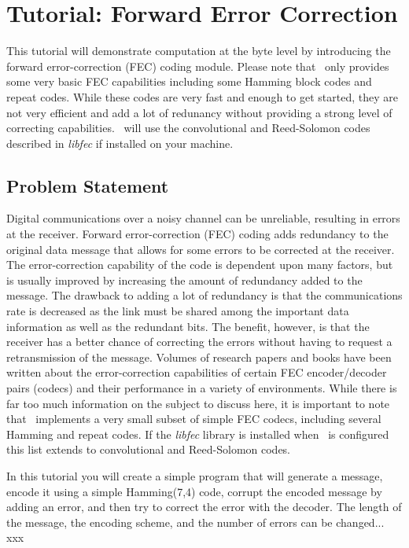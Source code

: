 % 
%

\newpage
\section{Tutorial: Forward Error Correction}
\label{tutorial:fec}

This tutorial will demonstrate computation at the byte level by
introducing the forward error-correction (FEC) coding module.
Please note that \liquid\ only provides some very basic FEC
capabilities including some Hamming block codes and repeat codes.
While these codes are very fast and enough to get started,
they are not very efficient and add a lot of redunancy without providing
a strong level of correcting capabilities.
\liquid\ will use the convolutional and Reed-Solomon codes described in
{\em libfec} \cite{libfec:web} if installed on your machine.

\subsection{Problem Statement}
\label{tutorial:fec:problem}
Digital communications over a noisy channel can be unreliable,
resulting in errors at the receiver.
Forward error-correction (FEC) coding adds redundancy to the original
data message that allows for some errors to be corrected at the
receiver.
The error-correction capability of the code is dependent upon many
factors, but is usually improved by increasing the amount of redundancy
added to the message.
The drawback to adding a lot of redundancy is that the communications
rate is decreased as the link must be shared among the important data
information as well as the redundant bits.
The benefit, however, is that the receiver has a better chance of
correcting the errors without having to request a retransmission of the
message.
Volumes of research papers and books have been written about the
error-correction capabilities of certain FEC encoder/decoder pairs
(codecs) and their performance in a variety of environments.
While there is far too much information on the subject to discuss here,
it is important to note that \liquid\ implements a very small subset of
simple FEC codecs, including several Hamming and repeat codes.
If the {\em libfec} \cite{libfec:web} library is installed when \liquid\
is configured this list extends to convolutional and Reed-Solomon codes.

In this tutorial you will create a simple program that will generate a
message, encode it using a simple Hamming(7,4) code, corrupt the encoded
message by adding an error, and then try to correct the error with the
decoder.
The length of the message, the encoding scheme, and the number of errors
can be changed... xxx


